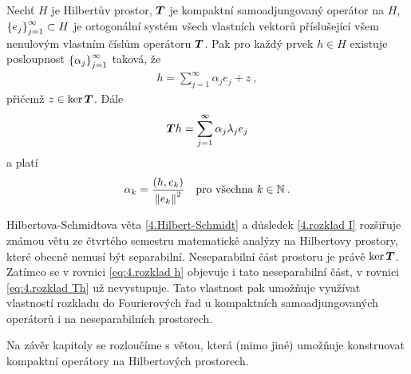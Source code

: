 \begin{corollary} \label{4.rozklad I}
Nechť $H$ je Hilbertův prostor, $\boldsymbol{T}$ je kompaktní samoadjungovaný operátor na $H$, $\left \lbrace e_j \right \rbrace_{j=1}^\infty \subset H$ je ortogonální systém všech vlastních vektorů příslušející všem nenulovým vlastním číslům operátoru $\boldsymbol{T}$. Pak pro každý prvek $h \in H$ existuje posloupnost $\left \lbrace \alpha_j \right \rbrace_{j=1}^\infty$ taková, že \begin{align} \label{eq:4.rozklad h}
    h = \sum_{j=1}^\infty \alpha_j e_j + z \:,
\end{align}
přičemž $z \in \mathrm{ker}\, \boldsymbol{T}$. Dále \begin{align} \label{eq:4.rozklad Th}
    \boldsymbol{T} h = \sum_{j=1}^\infty \alpha_j \lambda_j e_j
\end{align}
a platí \begin{align*}
    \alpha_k = \dfrac{(h, e_k)}{\left\lVert e_k\right\rVert^2} \quad \text{pro všechna } k \in \mathbb{N} \:.
\end{align*}
\end{corollary}

\begin{remark}
Hilbertova-Schmidtova věta \ref{4.Hilbert-Schmidt} a důsledek \ref{4.rozklad I} rozšiřuje známou větu ze čtvrtého semestru matematické analýzy na Hilbertovy prostory, které obecně nemusí být separabilní. Neseparabilní část prostoru je právě $\mathrm{ker}\, \boldsymbol{T}$. Zatímco se v rovnici \eqref{eq:4.rozklad h} objevuje i tato neseparabilní část, v rovnici \eqref{eq:4.rozklad Th} už nevystupuje. Tato vlastnost pak umožňuje využívat vlastností rozkladu do Fourierových řad u kompaktních samoadjungovaných operátorů i na neseparabilních prostorech.
\end{remark}

Na závěr kapitoly se rozloučíme s větou, která (mimo jiné) umožňuje konstruovat kompaktní operátory na Hilbertových prostorech.


